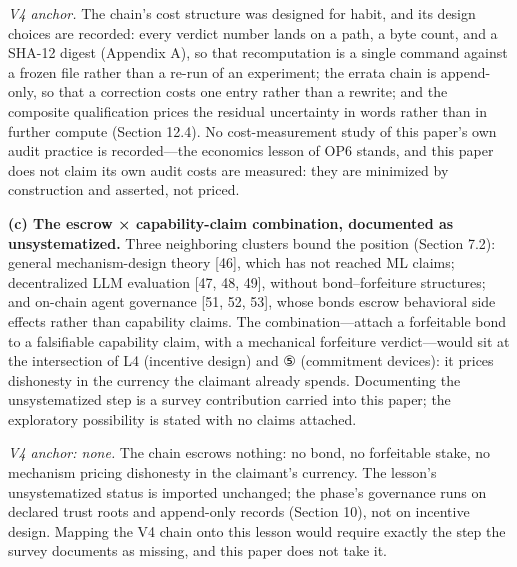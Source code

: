 \documentclass[11pt]{article}
\begin{document}
\noindent \emph{V4 anchor.} The chain's cost structure was designed for habit, and its design choices are recorded: every verdict number lands on a path, a byte count, and a SHA-12 digest (Appendix A), so that recomputation is a single command against a frozen file rather than a re-run of an experiment; the errata chain is append-only, so that a correction costs one entry rather than a rewrite; and the composite qualification prices the residual uncertainty in words rather than in further compute (Section 12.4). No cost-measurement study of this paper's own audit practice is recorded—the economics lesson of OP6 stands, and this paper does not claim its own audit costs are measured: they are minimized by construction and asserted, not priced.\par
\noindent \textbf{(c) The escrow × capability-claim combination, documented as unsystematized.} Three neighboring clusters bound the position (Section 7.2): general mechanism-design theory [46], which has not reached ML claims; decentralized LLM evaluation [47, 48, 49], without bond–forfeiture structures; and on-chain agent governance [51, 52, 53], whose bonds escrow behavioral side effects rather than capability claims. The combination—attach a forfeitable bond to a falsifiable capability claim, with a mechanical forfeiture verdict—would sit at the intersection of L4 (incentive design) and ⑤ (commitment devices): it prices dishonesty in the currency the claimant already spends. Documenting the unsystematized step is a survey contribution carried into this paper; the exploratory possibility is stated with no claims attached.\par
\noindent \emph{V4 anchor: none.} The chain escrows nothing: no bond, no forfeitable stake, no mechanism pricing dishonesty in the claimant's currency. The lesson's unsystematized status is imported unchanged; the phase's governance runs on declared trust roots and append-only records (Section 10), not on incentive design. Mapping the V4 chain onto this lesson would require exactly the step the survey documents as missing, and this paper does not take it.\par
\end{document}

